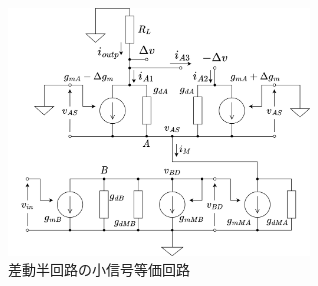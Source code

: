 \documentclass[twocolumn]{jsarticle}
\begin{document}
    \begin{figure}[H]
        \begin{center}
            \includegraphics*[width = 80mm]{figures/NtoNHalfDiffEqual.png}
            \caption{差動半回路の小信号等価回路}
            \label{fig:NtoNhalfeq}
        \end{center}
    \end{figure}

    \newpage
\end{document}
